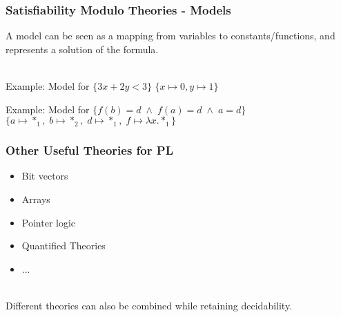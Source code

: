 \documentclass{beamer}
\makeatletter
\newcommand{\hl}{\textcolor{fibeamer@darkColor1}}
\makeatother
\begin{document}
\begin{frame}
    \frametitle{Satisfiability Modulo Theories - Models}

    A model can be seen as a mapping from variables to constants/functions, and represents
		a solution of the formula.\\~\\

		\begin{exampleblock}{Example: Model for $\{3x + 2y < 3\}$}
				$\{ x \mapsto 0, y \mapsto 1\}$
		\end{exampleblock}

		\pause

		\begin{exampleblock}{Example: Model for $\{f(b) = d \; \wedge \; f(a) = d \; \wedge \; a = d\}$}
				$\{ a \mapsto *_1,\; b \mapsto *_2,\; d \mapsto *_1,\; f \mapsto \lambda x. *_1\}$
		\end{exampleblock}
\end{frame}

\begin{frame}
    \frametitle{Other Useful Theories for PL}

    \begin{itemize}
        \item Bit vectors
        \item Arrays
        \item Pointer logic
        \item Quantified Theories
				\item ...
    \end{itemize}~\\

		Different theories can also be combined while retaining decidability.
\end{frame}
\end{document}
